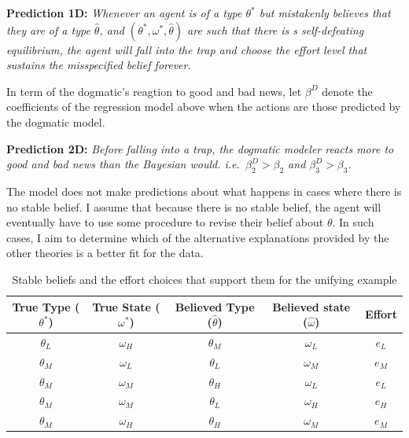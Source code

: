 \documentclass[
  12pt,
]{article}
\begin{document}
\textbf{Prediction 1D:} \emph{Whenever an agent is of a type
\(\theta^*\) but mistakenly believes that they are of a type
\(\hat{\theta}\), and \((\theta^*, \omega^*, \hat{\theta})\) are such
that there is s self-defeating equilibrium, the agent will fall into the
trap and choose the effort level that sustains the misspecified belief
forever.}

In term of the dogmatic's reagtion to good and bad news, let \(\beta^D\)
denote the coefficients of the regression model above when the actions
are those predicted by the dogmatic model.

\textbf{Prediction 2D:} \emph{Before falling into a trap, the dogmatic
modeler reacts more to good and bad news than the Bayesian would.
i.e.~\(\beta_2^D>\beta_2\) and \(\beta_3^D > \beta_3\).}

The model does not make predictions about what happens in cases where
there is no stable belief. I assume that because there is no stable
belief, the agent will eventually have to use some procedure to revise
their belief about \(\theta\). In such cases, I aim to determine which
of the alternative explanations provided by the other theories is a
better fit for the data.

\begin{table}[htbp]

    \centering
    \begin{tabular}{|c|c|c|c|c|}
        \hline
        \textbf{True Type ($\theta^*$)} & \textbf{True State ($\omega^*$)} & \textbf{Believed Type ($\hat{\theta}$)} & \textbf{Believed state ($\hat{\omega}$)} & \textbf{Effort} \\
        \hline
        \hline
        $\theta_L$ & $\omega_H$ & $\theta_M$ & $\omega_L$ & $e_L$ \\
        \hline
        $\theta_M$ & $\omega_L$ & $\theta_L$ & $\omega_M$ & $e_M$ \\
        \hline
        $\theta_M$ & $\omega_M$ & $\theta_H$ & $\omega_L$ & $e_L$ \\
        \hline
        $\theta_M$ & $\omega_M$ & $\theta_L$ & $\omega_H$ & $e_H$ \\
        \hline
        $\theta_M$ & $\omega_H$ & $\theta_H$ & $\omega_M$ & $e_M$ \\
        \hline
        
        
    \end{tabular}
    \caption{Stable beliefs and the effort choices that support them for the unifying example}
    \label{tab:table-dog}
\end{table}
\end{document}
